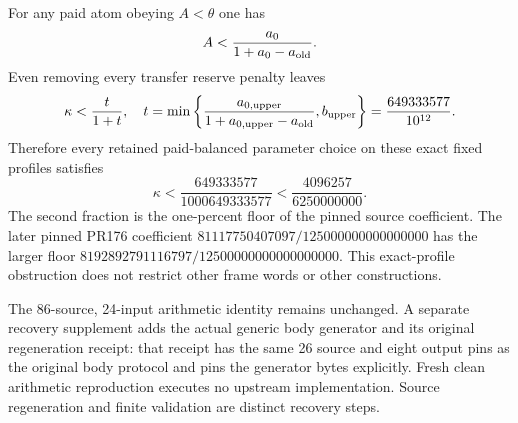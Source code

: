\documentclass{article}
\begin{document}
For any paid atom obeying $A<\theta$ one has
\[
 A<\frac{a_0}{1+a_0-a_{\rm old}}.
\]
Even removing every transfer reserve penalty leaves
\[
 \kappa<\frac{t}{1+t},\quad
 t=\min\left\{\frac{a_{0,\rm upper}}{1+a_{0,\rm upper}-a_{\rm old}},
                         b_{\rm upper}\right\}
  =\frac{649333577}{10^{12}}.
\]
Therefore every retained paid-balanced parameter choice on these exact fixed
profiles satisfies
\[
 \kappa<\frac{649333577}{1000649333577}
       <\frac{4096257}{6250000000}.
\]
The second fraction is the one-percent floor of the pinned source coefficient.
The later pinned PR176 coefficient
$81117750407097/125000000000000000$ has the larger floor
$8192892791116797/12500000000000000000$. This exact-profile obstruction
does not restrict other frame words or other constructions.

The 86-source, 24-input arithmetic identity remains unchanged. A separate
recovery supplement adds the actual generic body generator and its original
regeneration receipt: that receipt has the same 26 source and eight output
pins as the original body protocol and pins the generator bytes explicitly.
Fresh clean arithmetic reproduction executes no upstream implementation.
Source regeneration and finite validation are distinct recovery steps.
\end{document}
